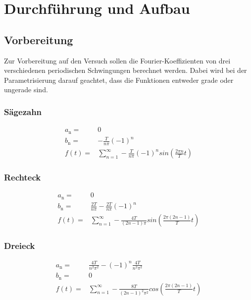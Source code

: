 \section{Durchführung und Aufbau}
\label{sec:Durchführung}
\subsection{Vorbereitung}
Zur Vorbereitung auf den Versuch sollen die Fourier-Koeffizienten von drei verschiedenen periodischen Schwingungen berechnet werden. Dabei wird bei der Parametrisierung darauf geachtet, dass die Funktionen entweder grade oder ungerade sind.
\subsubsection{Sägezahn}
\begin{eqnarray}
  a_\text{n} =& 0	\\
  b_\text{n} =& - \frac{T}{n \pi} (-1)^n	\\
  f(t) =& \sum^{\infty}_{n=1} - \frac{T}{n \pi} (-1)^n sin \left( \frac{2 \pi n}{T} t \right)
  \label{eqn:saege}
\end{eqnarray}

\subsubsection{Rechteck}
\begin{eqnarray}
  a_\text{n} =& 0	\\
  b_\text{n} =& \frac{2 T}{n \pi} - \frac{2T}{n \pi} (-1)^n	\\
  f(t) =& \sum^{\infty}_{n=1} - \frac{4 T}{(2n-1) \pi} sin \left( \frac{2 \pi (2n -1)}{T} t \right)
  \label{eqn:recht}
\end{eqnarray}
\subsubsection{Dreieck}
\begin{eqnarray}
  a_\text{n} =& \frac{4 T}{n^2 \pi^2} -  (-1)^n \frac{4T}{n^2 \pi^2}     \\
  b_\text{n} =& 0       \\
  f(t) =& \sum^{\infty}_{n=1} - \frac{8 T}{(2n-1)^2 \pi^2} cos \left( \frac{2 \pi (2n -1)}{T} t \right)
  \label{eqn:recht}
\end{eqnarray}

